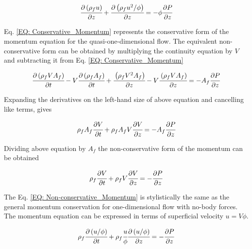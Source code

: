 \documentclass[../Article_Model_Parameters.tex]{subfiles}
\begin{document}
	{\footnotesize
		\begin{equation}
			\cfrac{\partial \left( \rho_f u \right)}{\partial z} + \cfrac{\partial \left( \rho_f u^2/\phi \right) }{\partial z} = -\phi \cfrac{\partial 	P}{\partial z}
		\end{equation}
	}

	Eq. \ref{EQ: Conservative_Momentum} represents the conservative form of the momentum equation for the quasi-one-dimensional flow. The equivalent non-conservative form can be obtained by multiplying the continuity equation by $V$ and subtracting it from Eq. \ref{EQ: Conservative_Momentum}
	
	{\footnotesize
		\begin{equation}
			\cfrac{\partial \left( \rho_f V A_f \right)}{\partial t} - V\cfrac{ \partial \left( \rho_f A_f \right) }{\partial t} + \cfrac{\left( \rho_f V^2 A_f 	\right)}{\partial z} - V \cfrac{\left( \rho_f V A_f \right)}{\partial z} = -A_f \cfrac{\partial P}{\partial z}
		\end{equation}
	}
	
	Expanding the derivatives on the left-hand size of above equation and cancelling like terms, gives

	{\footnotesize
		\begin{equation}
			\rho_f A_f \cfrac{\partial V}{\partial t} + \rho_f A_f V \cfrac{\partial V}{\partial z} = -A_f \cfrac{\partial P}{\partial z}
		\end{equation}
	}

	Dividing above equation by $A_f$ the non-conservative form of the momentum can be obtained
	
	{\footnotesize
		\begin{equation}
			\rho_f \cfrac{\partial V}{\partial t} + \rho_f V \cfrac{\partial V}{\partial z} = -\cfrac{\partial P}{\partial z}
			\label{EQ: Non-conservative_Momentum}
		\end{equation}
	}

	The Eq. \ref{EQ: Non-conservative_Momentum} is stylistically the same as the general momentum conservation for one-dimensional flow with no-body forces. The momentum equation can be expressed in terms of superficial velocity $u=V\phi$. 
	
	{\footnotesize
		\begin{equation}
			\rho_f \cfrac{\partial \left(u / \phi \right)}{\partial t} + \rho_f \cfrac{u}{\phi} \cfrac{\partial \left( u / \phi \right)}{\partial z} = - \cfrac{\partial P}{\partial z}
		\end{equation}
	}
\end{document}
